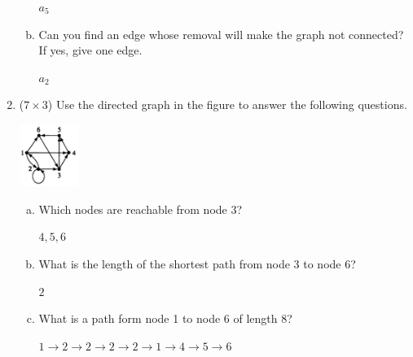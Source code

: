 \documentclass[12pt]{article}
\begin{document}
\begin{enumerate}
\begin{enumerate}[a.]
			$a_5$
			\item
			Can you find an edge whose removal will make the graph not connected? If yes, give one edge.

			$a_2$
		\end{enumerate}


		\newpage
		\item ($7 \times 3$)
		Use the directed graph in the figure to answer the following questions.
		\begin{center}
			\includegraphics[width=0.15\textwidth]{HW10-2}
		\end{center}
		\begin{enumerate}[a.]
			\item
			Which nodes are reachable from node 3?

			$4, 5, 6$
			\item
			What is the length of the shortest path from node 3 to node 6?

			$2$
			\item
			What is a path form node 1 to node 6 of length 8?

			$1 \to 2 \to 2  \to 2  \to 2 \to 1 \to 4 \to 5 \to 6$
		\end{enumerate}







	\end{enumerate}
\end{document}
